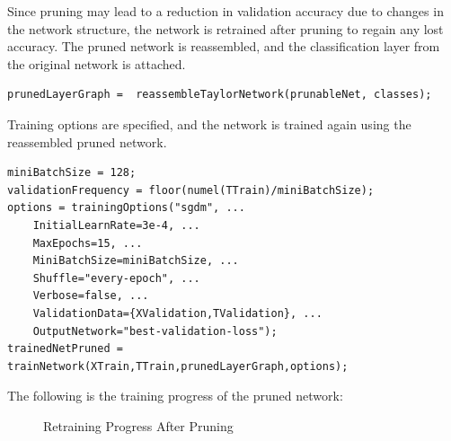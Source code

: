 \documentclass[a4paper]{report}
\begin{document}
{Since pruning may lead to a reduction in validation accuracy due to changes in the network structure, the network is retrained after pruning to regain any lost accuracy. The pruned network is reassembled, and the classification layer from the original network is attached.

\begin{center}
\begin{tcolorbox}[breakable, enhanced, boxsep=10pt]
\begin{verbatim}
prunedLayerGraph =  reassembleTaylorNetwork(prunableNet, classes);
\end{verbatim}
\end{tcolorbox}
\end{center}

Training options are specified, and the network is trained again using the reassembled pruned network.

\begin{center}
\begin{tcolorbox}[breakable, enhanced, boxsep=10pt]
\begin{verbatim}
miniBatchSize = 128;
validationFrequency = floor(numel(TTrain)/miniBatchSize);
options = trainingOptions("sgdm", ...
    InitialLearnRate=3e-4, ...
    MaxEpochs=15, ...
    MiniBatchSize=miniBatchSize, ...
    Shuffle="every-epoch", ...
    Verbose=false, ...
    ValidationData={XValidation,TValidation}, ...
    OutputNetwork="best-validation-loss");
trainedNetPruned = trainNetwork(XTrain,TTrain,prunedLayerGraph,options);
\end{verbatim}
\end{tcolorbox}
\end{center}
The following is the training progress of the pruned network:
\begin{figure}[H]
    \setlength{\fboxsep}{0pt} %
    \setlength{\fboxrule}{1pt} %
    \begin{center}
     \end{center} %
    \caption{Retraining Progress After Pruning}
    \label{fig:training}
\end{figure}
}
\end{document}
